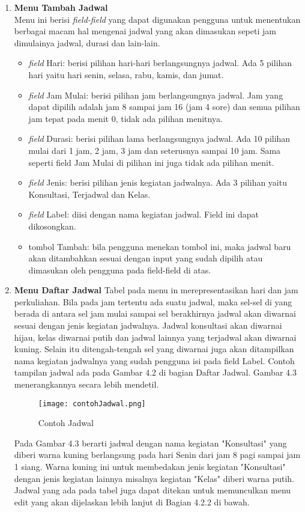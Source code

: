 \begin{enumerate}
\item \textbf{Menu Tambah Jadwal}\\ Menu ini berisi\textit{ field-field} yang dapat digunakan pengguna untuk menentukan berbagai macam hal mengenai jadwal yang akan dimasukan sepeti jam dimulainya jadwal, durasi dan lain-lain.
	\begin{itemize}
		\item \textit{field} Hari: berisi pilihan hari-hari berlangsungnya jadwal. Ada 5 pilihan hari yaitu hari senin, selasa, rabu, kamis, dan jumat.
		\item \textit{field} Jam Mulai: berisi pilihan jam berlangsungnya jadwal. Jam yang dapat dipilih adalah jam 8 sampai jam 16 (jam 4 sore) dan semua 		pilihan jam tepat pada menit 0, tidak ada pilihan menitnya.
		\item \textit{field} Durasi: berisi pilihan lama berlangsungnya jadwal. Ada 10 pilihan mulai dari 1 jam, 2 jam, 3 jam dan seterusnya sampai 10 			jam. Sama seperti field Jam Mulai di pilihan ini juga tidak ada pilihan menit.
		\item \textit{field} Jenis: berisi pilihan jenis kegiatan jadwalnya. Ada 3 pilihan yaitu Konsultasi, Terjadwal dan Kelas.
		\item \textit{field} Label: diisi dengan nama kegiatan jadwal. Field ini dapat dikosongkan.
		\item tombol Tambah: bila pengguna menekan tombol ini, maka jadwal baru akan ditambahkan sesuai dengan input yang sudah dipilih atau dimasukan oleh pengguna pada field-field di atas.
	\end{itemize}
\item \textbf{Menu Daftar Jadwal} \newline
Tabel pada menu in merepresentasikan hari dan jam perkuliahan. Bila pada jam tertentu ada suatu jadwal, maka sel-sel di yang berada di antara sel jam mulai sampai sel berakhirnya jadwal akan diwarnai sesuai dengan jenis kegiatan jadwalnya. Jadwal konsultasi akan diwarnai hijau, kelas diwarnai putih dan jadwal lainnya yang terjadwal akan diwarnai kuning. Selain itu ditengah-tengah sel yang diwarnai juga akan ditampilkan nama kegiatan jadwalnya yang sudah pengguna isi pada field Label. Contoh tampilan jadwal ada pada Gambar 4.2 di bagian Daftar Jadwal. Gambar 4.3 menerangkannya secara lebih mendetil.
		\begin{figure} [H]
			\centering  
			\texttt{[image: contohJadwal.png]}
			\caption[Contoh Jadwal]{Contoh Jadwal} 
			\label{fig:flow-chart-CodeIgniter} 
		\end{figure}
		Pada Gambar 4.3 berarti jadwal dengan nama kegiatan "Konsultasi" yang diberi warna kuning berlangsung pada hari Senin dari jam 8 pagi sampai jam 1 siang. Warna kuning ini untuk membedakan jenis kegiatan "Konsultasi" dengan jenis kegiatan lainnya misalnya kegiatan "Kelas" diberi warna putih. Jadwal yang ada pada tabel juga dapat ditekan untuk memunculkan menu edit yang akan dijelaskan lebih lanjut di Bagian 4.2.2 di bawah.
\end{enumerate}
